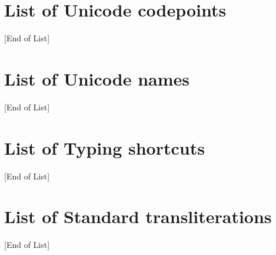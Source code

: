 \documentclass{article}
\newcommand\eolist{{\tiny [End of List]}\par}
\begin{document}





\section{List of Unicode codepoints}\label{sec:listcauc}
\begin{multicols}{4}\noindent
\catag
\cashowplainlistuc
\eolist
\end{multicols}

\section{List of Unicode names}\label{sec:listcaun}
\begin{multicols}{4}\noindent
\catag
\cashowplainlistun
\eolist
\end{multicols}


\section{List of Typing shortcuts}\label{sec:listcats}
\begin{multicols}{4}\noindent
\catag
\cashowplainlistts
\eolist
\end{multicols}

\section{List of Standard transliterations}\label{sec:listcast}
\begin{multicols}{4}\noindent
\catag
\cashowplainlistst
\eolist
\end{multicols}
\end{document}
